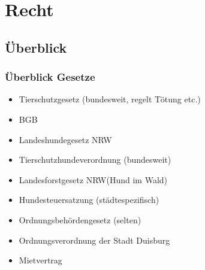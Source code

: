\chapter{Recht}


\section{Überblick}

    \subsection{Überblick Gesetze}
    \begin{itemize}
        \item Tierschutzgesetz (bundesweit, regelt Tötung etc.)
        \item BGB
        \item Landeshundegesetz NRW
        \item Tierschutzhundeverordnung (bundesweit)
        \item Landesforstgesetz NRW(Hund im Wald)
        \item Hundesteuersatzung (städtespezifisch)
        \item Ordnungsbehördengesetz (selten)
        \item Ordnungsverordnung der Stadt Duisburg
        \item Mietvertrag
    \end{itemize}

    \clearpage
